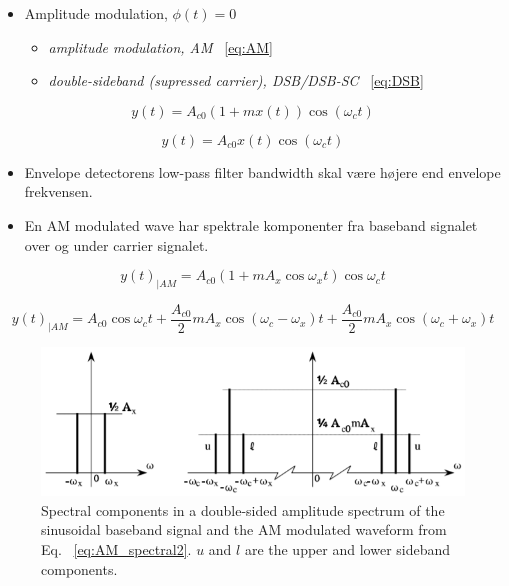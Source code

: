 \begin{itemize}
	\item Amplitude modulation, $\phi(t) = 0$
	\begin{itemize}
		\item \textit{amplitude modulation, AM} ~\ref{eq:AM}
		\item \textit{double-sideband (supressed carrier), DSB/DSB-SC} ~\ref{eq:DSB}
	\end{itemize}
\end{itemize} 

\begin{equation}\label{eq:AM}
y(t) = A_{c0}(1+m x(t)) \cos(\omega_c t)
\end{equation}

\begin{equation}\label{eq:DSB}
y(t) = A_{c0} x(t) \cos(\omega_c t)
\end{equation}

\begin{itemize}
	\item Envelope detectorens low-pass filter bandwidth skal være højere end envelope frekvensen. 
	\item En AM modulated wave har spektrale komponenter fra baseband signalet over og under carrier signalet. 
\end{itemize}

\begin{equation}\label{eq:AM_spectral1}
y(t)_{|AM} = A_{c0}(1+m A_x \cos \omega_x t) \cos \omega_c t
\end{equation}

\begin{equation}\label{eq:AM_spectral2}
y(t)_{|AM} = A_{c0} \cos \omega_c t + \dfrac{A_{c0}}{2}m A_x \cos(\omega_c-\omega_x) t + \dfrac{A_{c0}}{2} m A_x \cos(\omega_c+\omega_x) t
\end{equation}

\begin{figure} [H]
	\centering
	\includegraphics[width=\linewidth]{graphics/5.png}
	\caption{ Spectral components in a double-sided amplitude spectrum of the sinusoidal baseband signal and the AM modulated waveform from Eq. ~\ref{eq:AM_spectral2}. $u$ and $l$ are the	upper and lower sideband components.}
	\label{fig:5}
\end{figure}

